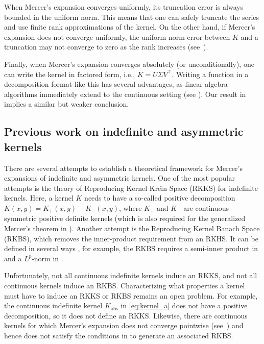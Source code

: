 \documentclass{article}
\begin{document}
When Mercer's expansion converges uniformly, its truncation error is always bounded in the uniform norm. This means that one can safely truncate the series and use finite rank approximations of the kernel. On the other hand, if Mercer's expansion does not converge uniformly, the uniform norm error between $K$ and a truncation may not converge to zero as the rank increases (see~).

Finally, when Mercer's expansion converges absolutely (or unconditionally), one can write the kernel in factored form, i.e., $K = U\Sigma V^\top$. Writing a function in a decomposition format like this has several advantages, as linear algebra algorithms immediately extend to the continuous setting (see \citep{townsend2015continuous}). Our result in  implies a similar but weaker conclusion. 

\subsection{Previous work on indefinite and asymmetric kernels}
There are several attempts to establish a theoretical framework for Mercer's expansions of indefinite and asymmetric kernels. One of the most popular attempts is the theory of Reproducing Kernel Kre{\u\i}n Space (RKKS) \citep{alpay2001schur,ong2004learning,loosli2015learning,huang2017indefinite} for indefinite kernels. Here, a kernel $K$ needs to have a so-called positive decomposition $K(x, y) = K_+(x, y) - K_-(x, y)$, where $K_+$ and $K_-$ are continuous symmetric positive definite kernels (which is also required for the generalized Mercer's theorem in \citep{chen2008generalized}). Another attempt is the Reproducing Kernel Banach Space (RKBS), which removes the inner-product requirement from an RKHS. It can be defined in several ways \citep{zhang2009reproducing,georgiev2013construction,xu2019generalized,lin2022reproducing}, for example, the RKBS requires a semi-inner product in \citep{zhang2009reproducing} and a $L^p$-norm in \citep{georgiev2013construction}. 

Unfortunately, not all continuous indefinite kernels induce an RKKS, and not all continuous kernels induce an RKBS. Characterizing what properties a kernel must have to induce an RKKS or RKBS remains an open problem. For example, the continuous indefinite kernel $K_\text{abs}$ in \cref{eq:kernel_a} does not have a positive decomposition, so it does not define an RKKS. Likewise, there are continuous kernels for which Mercer's expansion does not converge pointwise (see~) and hence does not satisfy the conditions in \citep{xu2019generalized} to generate an associated RKBS.
\end{document}

